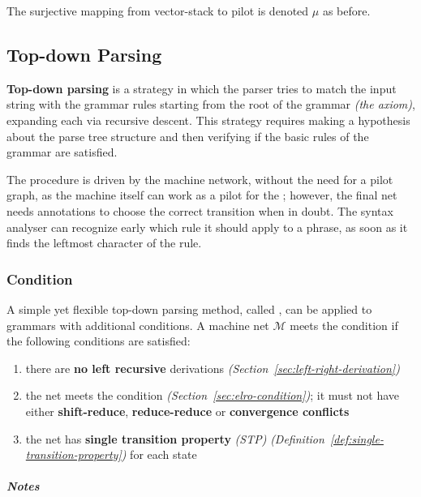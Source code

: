 \documentclass[english]{article}
\begin{document}
\bigskip
The surjective mapping from vector-stack \mstates to pilot \mstates is denoted \(\mu\) as before.

\subsection{Top-down Parsing}
\label{sec:top-down}

\textbf{Top-down parsing} is a strategy in which the parser tries to match the input string with the grammar rules starting from the root of the grammar \textit{(the axiom)}, expanding each \RP via recursive descent.
This strategy requires making a hypothesis about the parse tree structure and then verifying if the basic rules of the grammar are satisfied.

\bigskip
The  procedure is driven by the machine network, without the need for a pilot graph, as the machine itself can work as a pilot for the \PDA;
however, the final net needs annotations to choose the correct transition when in doubt.
The syntax analyser can recognize early which rule it should apply to a phrase, as soon as it finds the leftmost character of the rule.

\subsubsection[ELL(1) Condition]{\ello Condition}

A simple yet flexible top-down parsing method, called \ello, can be applied to \elro grammars with additional conditions.
A machine net \(\mathcal{M}\) meets the \ello condition if the following conditions are satisfied:

\begin{enumerate}[label=\arabic*., ref=(\arabic*)]
  \item\label{enum:ell1-condition-1} there are \textbf{no left recursive} derivations \textit{(Section~\ref{sec:left-right-derivation})}
  \item\label{enum:ell1-condition-2} the net meets the \elro condition \textit{(Section~\ref{sec:elro-condition})}; it must not have either \textbf{shift-reduce}, \textbf{reduce-reduce} or \textbf{convergence conflicts}
  \item\label{enum:ell1-condition-3} the net has \textbf{single transition property} \textit{(STP)} \textit{(Definition~\ref{def:single-transition-property})} for each state
\end{enumerate}

\subparagraph*{Notes}
\end{document}
